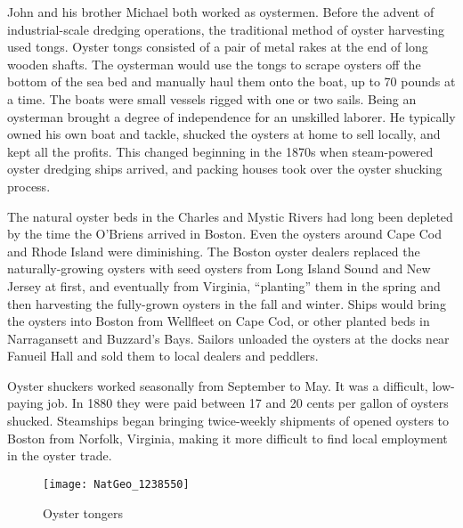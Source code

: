 John and his brother Michael both worked as oystermen.\cite{EdwardFrancis3OBrienBirth,Michael2OBrien1886,1861John2OBrien} Before the advent of industrial-scale dredging operations, the traditional method of oyster harvesting used tongs. Oyster tongs consisted of a pair of metal rakes at the end of long wooden shafts. The oysterman would use the tongs to scrape oysters off the bottom of the sea bed and manually haul them onto the boat, up to 70 pounds at a time. The boats were small vessels rigged with one or two sails.\cite{Botwick:95} Being an oysterman brought a degree of independence for an unskilled laborer. He typically owned his own boat and tackle, shucked the oysters at home to sell locally, and kept all the profits.\cite{MacKenzie:7:1, Botwick:96} This changed beginning in the 1870s when steam-powered oyster dredging ships arrived, and packing houses took over the oyster shucking process.\cite{MacKenzie:5, MacKenzie:7:2} 

The natural oyster beds in the Charles and Mystic Rivers had long been depleted by the time the O'Briens arrived in Boston. Even the oysters around Cape Cod and Rhode Island were diminishing. The Boston oyster dealers replaced the naturally-growing oysters with seed oysters from Long Island Sound and New Jersey at first, and eventually from Virginia, ``planting'' them in the spring and then harvesting the fully-grown oysters in the fall and winter. Ships would bring the oysters into Boston from Wellfleet on Cape Cod, or other planted beds in Narragansett and Buzzard's Bays. Sailors unloaded the oysters at the docks near Fanueil Hall and sold them to local dealers and peddlers.\cite{Ingersoll:27-28} 

Oyster shuckers worked seasonally from September to May. It was a difficult, low-paying job. In 1880 they were paid between 17 and 20 cents per gallon of oysters shucked. Steamships began bringing twice-weekly shipments of opened oysters to Boston from Norfolk, Virginia, making it more difficult to find local employment in the oyster trade.\cite{Ingersoll:30}

\begin{figure}
	\centering
	\texttt{[image: NatGeo\_1238550]}
	\caption{Oyster tongers}
	\label{fig:OysterTongers}
\end{figure}


